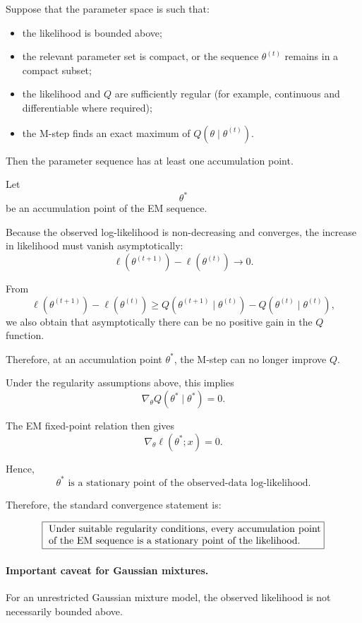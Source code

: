 Suppose that the parameter space is such that:

\begin{itemize}
    \item the likelihood is bounded above;
    \item the relevant parameter set is compact, or the sequence
    $\theta^{(t)}$ remains in a compact subset;
    \item the likelihood and $Q$ are sufficiently regular
    (for example, continuous and differentiable where required);
    \item the M-step finds an exact maximum of
    $Q(\theta\mid\theta^{(t)})$.
\end{itemize}

Then the parameter sequence has at least one accumulation point.

Let
\[
\theta^*
\]
be an accumulation point of the EM sequence.

Because the observed log-likelihood is non-decreasing and converges,
the increase in likelihood must vanish asymptotically:
\[
\ell(\theta^{(t+1)})
-
\ell(\theta^{(t)})
\longrightarrow0.
\]

From
\[
\ell(\theta^{(t+1)})-\ell(\theta^{(t)})
\geq
Q(\theta^{(t+1)}\mid\theta^{(t)})
-
Q(\theta^{(t)}\mid\theta^{(t)}),
\]
we also obtain that asymptotically there can be no positive gain in
the $Q$ function.

Therefore, at an accumulation point $\theta^*$, the M-step can no
longer improve $Q$.

Under the regularity assumptions above, this implies
\[
\nabla_\theta Q(\theta^*\mid\theta^*)=0.
\]

The EM fixed-point relation then gives
\[
\nabla_\theta \ell(\theta^*;x)=0.
\]

Hence,
\[
\boxed{
\theta^*
\text{ is a stationary point of the observed-data log-likelihood.}
}
\]

Therefore, the standard convergence statement is:

\[
\fbox{
\parbox{0.8\textwidth}{
Under suitable regularity conditions, every accumulation point
of the EM sequence is a stationary point of the likelihood.}}
\]

\paragraph{Important caveat for Gaussian mixtures.}

For an unrestricted Gaussian mixture model, the observed likelihood is
not necessarily bounded above.

